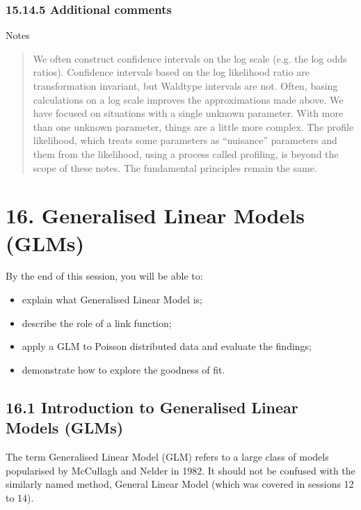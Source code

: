 \documentclass[letterpaper,10pt,english]{jupyterBook}
\begin{document}
\subsection{15.14.5 Additional comments}
\label{\detokenize{15.m. Logistic Regression:additional-comments}}
\sphinxAtStartPar
Notes
\begin{quote}

\sphinxAtStartPar
We often construct confidence intervals on the log scale (e.g. the log odds ratios). Confidence intervals based on the log likelihood ratio are transformation invariant, but Wald\sphinxhyphen{}type intervals are not. Often, basing calculations on a log scale improves the approximations made above. 
We have focused on situations with a single unknown parameter. With more than one unknown parameter, things are a little more complex. The profile likelihood, which treats some parameters as “nuisance” parameters and  them from the likelihood, using a process called profiling, is beyond the scope of these notes. The fundamental principles remain the same.
\end{quote}


\chapter{16. Generalised Linear Models (GLMs)}
\label{\detokenize{16.a. Generalised Linear Model (GLM):generalised-linear-models-glms}}\label{\detokenize{16.a. Generalised Linear Model (GLM)::doc}}


\sphinxAtStartPar
By the end of this session, you will be able to:
\begin{itemize}
\item {} 
\sphinxAtStartPar
explain what Generalised Linear Model is;

\item {} 
\sphinxAtStartPar
describe the role of a link function;

\item {} 
\sphinxAtStartPar
apply a GLM to Poisson distributed data and evaluate the findings;

\item {} 
\sphinxAtStartPar
demonstrate how to explore the goodness of fit.

\end{itemize}




\section{16.1 Introduction to Generalised Linear Models (GLMs)}
\label{\detokenize{16.b. Generalised Linear Model (GLM):introduction-to-generalised-linear-models-glms}}\label{\detokenize{16.b. Generalised Linear Model (GLM)::doc}}
\sphinxAtStartPar
The term Generalised Linear Model (GLM) refers to a large class of models popularised by McCullagh and Nelder in 1982. It should not be confused with the similarly named method, General Linear Model (which was covered in sessions 12 to 14).
\end{document}
